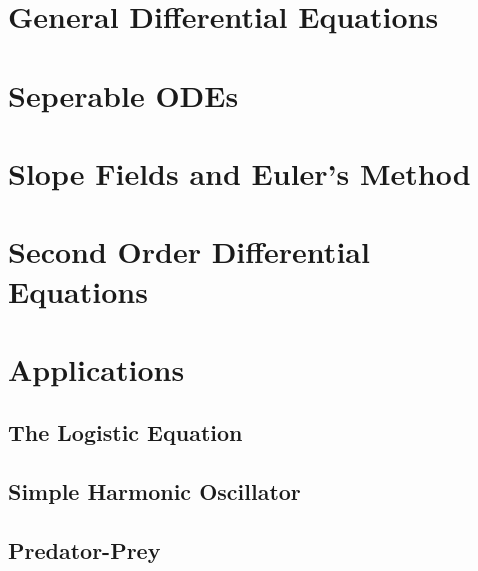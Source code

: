 
\section{General Differential Equations}


\section{Seperable ODEs}


\section{Slope Fields and Euler's Method}


\section{Second Order Differential Equations}


\section{Applications}
\subsection{The Logistic Equation}
\subsection{Simple Harmonic Oscillator}
\subsection{Predator-Prey}
